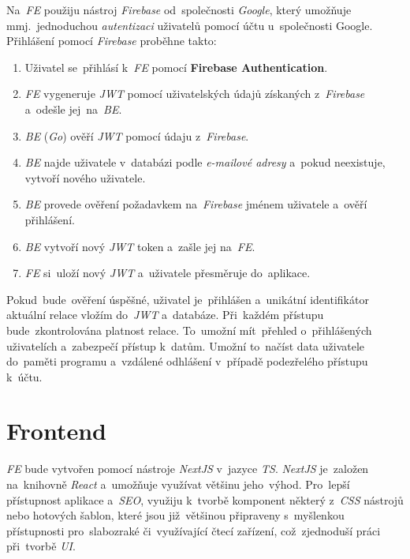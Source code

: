 \documentclass[11pt,a4paper]{report}
\let\oldacrshort\acrshort
\renewcommand{\acrshort}[1]{\emph{\normalsize\color[rgb]{0,0,0}\noindent\oldacrshort{#1}}}
\begin{document}
            Na~\acrshort{FE} použiju nástroj \emph{Firebase} od~společnosti \emph{Google}, který umožňuje mmj.~jednoduchou \emph{autentizaci} uživatelů pomocí účtu u~společnosti Google. Přihlášení pomocí \emph{Firebase} proběhne takto:
            \begin{enumerate}
                \item Uživatel se~přihlásí k~\acrshort{FE} pomocí \textbf{Firebase Authentication}.
                \item \acrshort{FE} vygeneruje \acrshort{JWT} pomocí uživatelských údajů získaných z~\emph{Firebase} a~odešle jej~na~\acrshort{BE}.
                \item \acrshort{BE} (\emph{Go}) ověří \acrshort{JWT} pomocí údaju z~\emph{Firebase}.
                \item \acrshort{BE} najde uživatele v~databázi podle \emph{e-mailové adresy} a~pokud neexistuje, vytvoří nového uživatele.
                \item \acrshort{BE} provede ověření požadavkem na~\emph{Firebase} jménem uživatele a~ověří přihlášení.
                \item \acrshort{BE} vytvoří nový \acrshort{JWT} token a~zašle jej na~\acrshort{FE}.
                \item \acrshort{FE} si~uloží nový \acrshort{JWT} a~uživatele přesměruje do~aplikace.
            \end{enumerate}
            
            Pokud~bude~ověření úspěšné, uživatel je~přihlášen a~unikátní identifikátor aktuální relace vložím do~\acrshort{JWT} a~databáze. Při~každém přístupu bude~zkontrolována platnost relace. To~umožní mít~přehled o~přihlášených uživatelích a~zabezpečí přístup k~datům. Umožní to~načíst data uživatele do~paměti programu a~vzdálené odhlášení v~případě podezřelého přístupu k~účtu.

        \section{Frontend}
            \acrshort{FE} bude vytvořen pomocí nástroje \emph{NextJS} v~jazyce \acrshort{TS}. \emph{NextJS} je~založen na~knihovně \emph{React} a~umožňuje využívat většinu jeho~výhod. Pro~lepší přístupnost aplikace a~\acrshort{SEO}, využiju k~tvorbě komponent některý z~\acrshort{CSS} nástrojů nebo hotových šablon, které jsou již~většinou připraveny s~myšlenkou přístupnosti pro~slabozraké či~využívající čtecí zařízení, což~zjednoduší práci při~tvorbě \acrshort{UI}.
\end{document}
